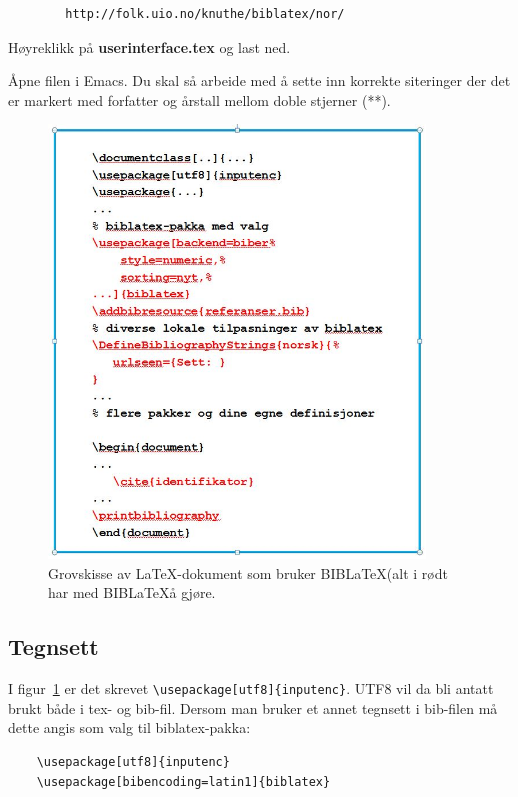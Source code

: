 \documentclass[11pt,norsk,a4paper]{article}
\newcommand{\blt}{B{\smaller[2]IB}\discretionary{-}{}{\kern
    -0.12em}\LaTeX{}}
\begin{document}
{\footnotesize\begin{verbatim}
        http://folk.uio.no/knuthe/biblatex/nor/
\end{verbatim}}

Høyreklikk på \textbf{userinterface.tex} og last ned.

Åpne filen i Emacs. Du skal så arbeide med å sette inn
korrekte siteringer der det er markert med forfatter og årstall mellom
doble stjerner (**).


\begin{figure}
\begin{center}
\includegraphics[width=10cm]{./documentstructure.jpg}
\caption{Grovskisse av \LaTeX-dokument som bruker \blt (alt i rødt har med \blt å gjøre.}\label{document}
\end{center}
\end{figure}

\subsection{Tegnsett}
I figur~\ref{document} er det skrevet
\verb=\usepackage[utf8]{inputenc}=. UTF8 vil da bli antatt brukt både
i tex- og bib-fil. Dersom man bruker et annet tegnsett i bib-filen må
dette angis som valg til biblatex-pakka:

{\footnotesize\begin{verbatim}
    \usepackage[utf8]{inputenc}
    \usepackage[bibencoding=latin1]{biblatex}
\end{verbatim}}
\end{document}
